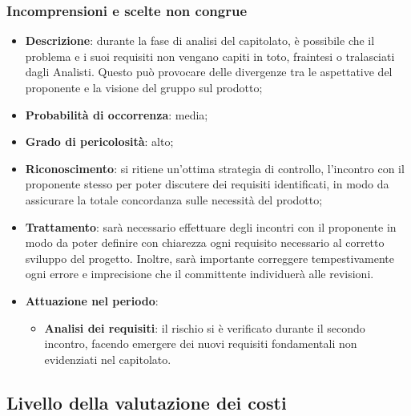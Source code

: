 		\subsubsection{Incomprensioni e scelte non congrue}
		\begin{itemize}
			\item \textbf{Descrizione}: durante la fase di analisi del capitolato, è possibile che il problema e i suoi requisiti non vengano capiti in toto, fraintesi o tralasciati dagli Analisti. Questo può provocare delle divergenze tra le aspettative del proponente e la 					visione del gruppo sul prodotto;
			\item \textbf{Probabilità di occorrenza}: media;
			\item \textbf{Grado di pericolosità}: alto;
			\item \textbf{Riconoscimento}: si ritiene un'ottima strategia di controllo, l'incontro con il proponente stesso per poter discutere dei requisiti identificati, in modo da assicurare la totale concordanza sulle necessità del prodotto;
			\item \textbf{Trattamento}: sarà necessario effettuare degli incontri con il proponente in modo da poter definire con chiarezza ogni requisito necessario al corretto sviluppo del progetto. Inoltre, sarà importante correggere tempestivamente ogni errore e 					imprecisione 	che il committente individuerà alle revisioni. 
			\item \textbf{Attuazione nel periodo}:
			\begin{itemize}
				\item \textbf{Analisi dei requisiti}:  il rischio si è verificato durante il secondo incontro, facendo emergere dei nuovi requisiti fondamentali non evidenziati nel capitolato.
			\end{itemize}
		\end{itemize}
	\subsection{Livello della valutazione dei costi}
